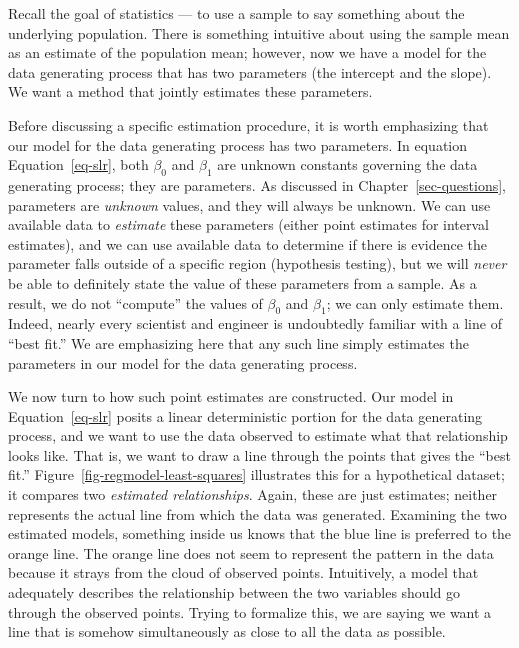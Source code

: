 \documentclass[
  letterpaper,
  DIV=11,
  numbers=noendperiod]{scrreprt}
\theoremstyle{definition}
\theoremstyle{definition}
\theoremstyle{plain}
\theoremstyle{remark}
\begin{document}
Recall the goal of statistics --- to use a sample to say something about
the underlying population. There is something intuitive about using the
sample mean as an estimate of the population mean; however, now we have
a model for the data generating process that has two parameters (the
intercept and the slope). We want a method that jointly estimates these
parameters.

Before discussing a specific estimation procedure, it is worth
emphasizing that our model for the data generating process has two
parameters. In equation Equation~\ref{eq-slr}, both \(\beta_0\) and
\(\beta_1\) are unknown constants governing the data generating process;
they are parameters. As discussed in Chapter~\ref{sec-questions},
parameters are \emph{unknown} values, and they will always be unknown.
We can use available data to \emph{estimate} these parameters (either
point estimates for interval estimates), and we can use available data
to determine if there is evidence the parameter falls outside of a
specific region (hypothesis testing), but we will \emph{never} be able
to definitely state the value of these parameters from a sample. As a
result, we do not ``compute'' the values of \(\beta_0\) and \(\beta_1\);
we can only estimate them. Indeed, nearly every scientist and engineer
is undoubtedly familiar with a line of ``best fit.'' We are emphasizing
here that any such line simply estimates the parameters in our model for
the data generating process.

We now turn to how such point estimates are constructed. Our model in
Equation~\ref{eq-slr} posits a linear deterministic portion for the data
generating process, and we want to use the data observed to estimate
what that relationship looks like. That is, we want to draw a line
through the points that gives the ``best fit.''
Figure~\ref{fig-regmodel-least-squares} illustrates this for a
hypothetical dataset; it compares two \emph{estimated relationships}.
Again, these are just estimates; neither represents the actual line from
which the data was generated. Examining the two estimated models,
something inside us knows that the blue line is preferred to the orange
line. The orange line does not seem to represent the pattern in the data
because it strays from the cloud of observed points. Intuitively, a
model that adequately describes the relationship between the two
variables should go through the observed points. Trying to formalize
this, we are saying we want a line that is somehow simultaneously as
close to all the data as possible.
\end{document}
